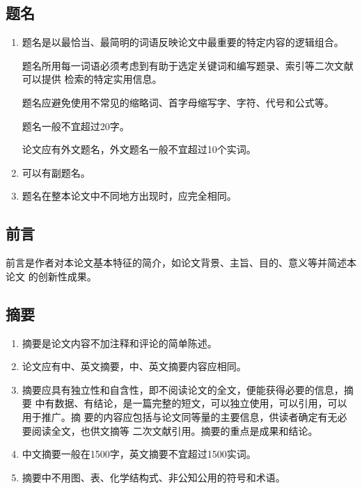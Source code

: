 \documentclass[oneside, phd]{njuthesis}
\begin{document}
\subsection{题名}

\begin{enumerate}

\item 题名是以最恰当、最简明的词语反映论文中最重要的特定内容的逻辑组合。

题名所用每一词语必须考虑到有助于选定关键词和编写题录、索引等二次文献可以提供
检索的特定实用信息。

题名应避免使用不常见的缩略词、首字母缩写字、字符、代号和公式等。

题名一般不宜超过20字。

论文应有外文题名，外文题名一般不宜超过10个实词。

\item 可以有副题名。
\item 题名在整本论文中不同地方出现时，应完全相同。
\end{enumerate}

\subsection{前言}

前言是作者对本论文基本特征的简介，如论文背景、主旨、目的、意义等并简述本论文
的创新性成果。

\subsection{摘要}

\begin{enumerate}

\item 摘要是论文内容不加注释和评论的简单陈述。

\item 论文应有中、英文摘要，中、英文摘要内容应相同。

\item 摘要应具有独立性和自含性，即不阅读论文的全文，便能获得必要的信息，摘要
中有数据、有结论，是一篇完整的短文，可以独立使用，可以引用，可以用于推广。摘
要的内容应包括与论文同等量的主要信息，供读者确定有无必要阅读全文，也供文摘等
二次文献引用。摘要的重点是成果和结论。

\item 中文摘要一般在1500字，英文摘要不宜超过1500实词。

\item 摘要中不用图、表、化学结构式、非公知公用的符号和术语。

\end{enumerate}
\end{document}
